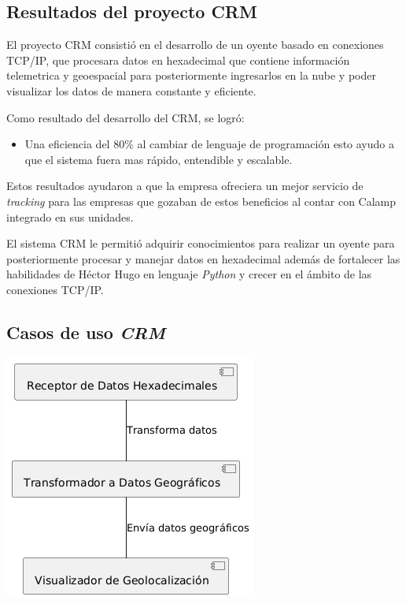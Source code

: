 \documentclass[protocolo.tex]{subfiles}
\begin{document}
\subsection{Resultados del proyecto CRM}

El proyecto CRM consistió en el desarrollo de un oyente basado en conexiones TCP/IP, que procesara datos en hexadecimal que contiene información telemetrica y geoespacial para posteriormente ingresarlos en la nube y poder visualizar los datos de manera constante y eficiente. \vspace{4mm}

Como resultado del desarrollo del CRM, se logró:

\begin{itemize}
    \item Una eficiencia del 80\% al cambiar de lenguaje de programación esto ayudo a que el sistema fuera mas rápido, entendible y escalable.
\end{itemize}

Estos resultados ayudaron a que la empresa ofreciera un mejor servicio de \textit{tracking} para las empresas que gozaban de estos beneficios al contar con Calamp integrado en sus unidades. \vspace{4mm}

El sistema CRM le permitió adquirir conocimientos para realizar un oyente para posteriormente procesar y manejar datos en hexadecimal además de fortalecer las habilidades de Héctor Hugo en lenguaje \textit{Python} y crecer en el ámbito de las conexiones TCP/IP.

\subsection{Casos de uso \textit{CRM}} 

\includegraphics[scale=0.6]{Imagenes/listener.png}
\end{document}
